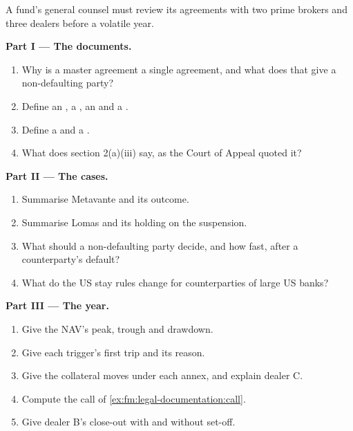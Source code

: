 \begin{problem}\label{pb:fm:legal-documentation:1}
A fund's general counsel must review its agreements with two prime brokers and three dealers before a volatile year.

\medskip\noindent\textbf{Part I --- The documents.}
\begin{enumerate}
\item Why is a master agreement a single agreement, and what does that give a non-defaulting party?
\item Define an , a , an  and a .
\item Define a  and a .
\item What does section 2(a)(iii) say, as the Court of Appeal quoted it?
\end{enumerate}

\medskip\noindent\textbf{Part II --- The cases.}
\begin{enumerate}[resume]
\item Summarise Metavante and its outcome.
\item Summarise Lomas and its holding on the suspension.
\item What should a non-defaulting party decide, and how fast, after a counterparty's default?
\item What do the US stay rules change for counterparties of large US banks?
\end{enumerate}

\medskip\noindent\textbf{Part III --- The year.}
\begin{enumerate}[resume]
\item Give the NAV's peak, trough and drawdown.
\item Give each trigger's first trip and its reason.
\item Give the collateral moves under each annex, and explain dealer C.
\item Compute the call of \cref{ex:fm:legal-documentation:call}.
\item Give dealer B's close-out with and without set-off.
\end{enumerate}


\end{problem}

